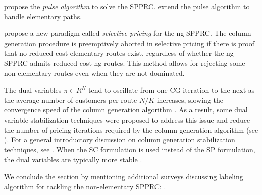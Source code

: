 \textcite{lozano2013} propose the \textit{pulse algorithm} to solve the SPPRC.
\textcite{lozano2016} extend the pulse algorithm to handle elementary paths.

\textcite{desaulniers2019} propose a new paradigm called \textit{selective pricing} for the ng-SPPRC.
The column generation procedure is preemptively aborted in selective pricing
if there is proof that no reduced-cost elementary routes exist,
regardless of whether the ng-SPPRC admits reduced-cost ng-routes.
This method allows for rejecting some non-elementary routes even when they are not dominated.

The dual variables $\pi \in R^N$ tend to oscillate from one CG iteration to the next
as the average number of customers per route $N / K$ increases,
slowing the convergence speed of the column generation algorithm \parencite{toth2014}.
As a result, some dual variable stabilization techniques were proposed to address this issue
and reduce the number of pricing iterations required by the column generation algorithm
(see \cite{dumerle1999, rousseau2007, pessoa2013, pessoa2018automation}).
For a general introductory discussion on column generation stabilization techniques, see \textcite{vanderbeck2005}.
When the SC formulation is used instead of the SP formulation,
the dual variables are typically more stable \parencite{rousseau2007, feillet2010}.

We conclude the section by mentioning additional surveys
discussing labeling algorithm for tackling the non-elementary SPPRC:
\textcite{irnich2005, pugliese2010, pugliese2013}.
